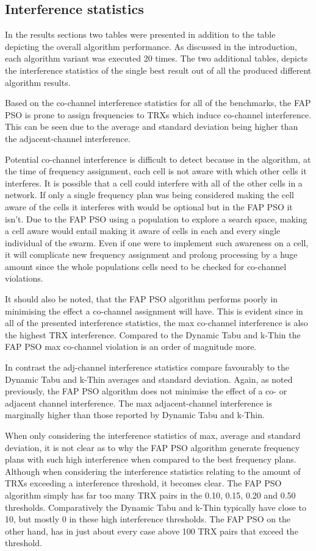 \subsection{Interference statistics}
In the results sections two tables were presented in addition to the table depicting the overall algorithm performance. As discussed in the introduction, each algorithm variant was executed 20 times. The two additional tables, depicts the interference statistics of the single best result out of all the produced different algorithm results.

Based on the co-channel interference statistics for all of the benchmarks, the FAP PSO is prone to assign frequencies to TRXs which induce co-channel interference. This can be seen due to the average and standard deviation being higher than the adjacent-channel interference.

Potential co-channel interference is difficult to detect because in the algorithm, at the time of frequency assignment, each cell is not aware with which other cells it interferes. It is possible that a cell could interfere with all of the other cells in a network. If only a single frequency plan was being considered making the cell aware of the cells it interferes with would be optional but in the FAP PSO it isn't. Due to the FAP PSO using a population to explore a search space, making a cell aware would entail making it aware of cells in each and every single individual of the swarm. Even if one were to implement such awareness on a cell, it will complicate new frequency assignment and prolong processing by a huge amount since the whole populations cells need to be checked for co-channel violations.

It should also be noted, that the FAP PSO algorithm performs poorly in minimising the effect a co-channel assignment will have. This is evident since in all of the presented interference statistics, the max co-channel interference is also the highest TRX interference. Compared to the Dynamic Tabu and k-Thin the FAP PSO max co-channel violation is an order of magnitude more.

In contrast the adj-channel interference statistics compare favourably to the Dynamic Tabu and k-Thin averages and standard deviation. Again, as noted previously, the FAP PSO algorithm does not minimise the effect of a co- or adjacent channel interference. The max adjacent-channel interference is marginally higher than those reported by Dynamic Tabu and k-Thin.

When only considering the interference statistics of max, average and standard deviation, it is not clear as to why the FAP PSO algorithm generate frequency plans with such high interference when compared to the best frequency plans. Although when considering the interference statistics relating to the amount of TRXs exceeding a interference threshold, it becomes clear. The FAP PSO algorithm simply has far too many TRX pairs in the 0.10, 0.15, 0.20 and 0.50 thresholds. Comparatively the Dynamic Tabu and k-Thin typically have close to 10, but mostly 0 in these high interference thresholds. The FAP PSO on the other hand, has in just about every case above 100 TRX pairs that exceed the threshold.

